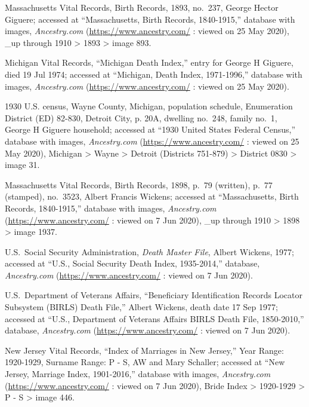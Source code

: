 \begin{thebibliography}{999}
	Massachusetts Vital Records, Birth Records, 1893, no.\  237, George Hector Giguere; accessed at ``Massachusetts, Birth Records, 1840-1915,'' database with images, \textit{Ancestry.com} (\url{https://www.ancestry.com/} : viewed on 25 May 2020), \_up through 1910 > 1893 > image 893.
	
	Michigan Vital Records, ``Michigan Death Index,'' entry for George H Giguere, died 19 Jul 1974; accessed at ``Michigan, Death Index, 1971-1996,'' database with images, \textit{Ancestry.com} (\url{https://www.ancestry.com/} : viewed on 25 May 2020).
	
	1930 U.S. census, Wayne County, Michigan, population schedule, Enumeration District (ED) 82-830, Detroit City, p. 20A, dwelling no.\ 248, family no.\ 1, George H Giguere household; accessed at ``1930 United States Federal Census,'' database with images, \textit{Ancestry.com} (\url{https://www.ancestry.com/} : viewed on 25 May 2020), Michigan > Wayne > Detroit (Districts 751-879) > District 0830 > image 31.

	
	
	
	
	Massachusetts Vital Records, Birth Records, 1898, p.\ 79 (written), p.\ 77 (stamped), no.\ 3523, Albert Francis Wickens; accessed at ``Massachusetts, Birth Records, 1840-1915,'' database with images, \textit{Ancestry.com} (\url{https://www.ancestry.com/} : viewed on 7 Jun 2020), \_up through 1910 > 1898 > image 1937.
	
	U.S.\ Social Security Administration, \textit{Death Master File}, Albert Wickens, 1977; accessed at ``U.S., Social Security Death Index, 1935-2014,'' database, \textit{Ancestry.com} (\url{https://www.ancestry.com/} : viewed on 7 Jun 2020).
	
	U.S.\ Department of Veterans Affairs, ``Beneficiary Identification Records Locator Subsystem (BIRLS) Death File,'' Albert Wickens, death date 17 Sep 1977; accessed at ``U.S., Department of Veterans Affairs BIRLS Death File, 1850-2010,'' database, \textit{Ancestry.com} (\url{https://www.ancestry.com/} : viewed on 7 Jun 2020).
	
	New Jersey Vital Records, ``Index of Marriages in New Jersey,'' Year Range: 1920-1929, Surname Range: P - S, AW and Mary Schaller; accessed at ``New Jersey, Marriage Index, 1901-2016,'' database with images, \textit{Ancestry.com} (\url{https://www.ancestry.com/} : viewed on 7 Jun 2020), Bride Index > 1920-1929 > P - S > image 446.
	

\end{thebibliography}

